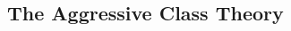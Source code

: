 \documentclass[11pt, letterpaper]{article}
\begin{document}
\begin{spacing}{2.0}
 








\section*{The Aggressive Class Theory %
}
 


\end{spacing}
\end{document}
